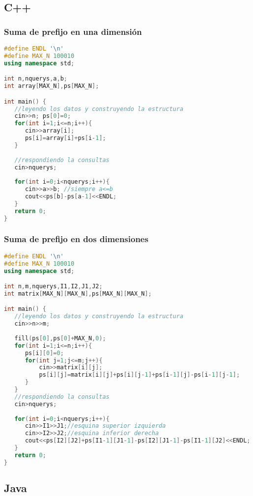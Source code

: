 \subsection{C++}
\subsubsection{Suma de prefijo en una dimensión}
\begin{lstlisting}[language=C++]
#define ENDL '\n'
#define MAX_N 100010
using namespace std;

int n,nquerys,a,b;
int array[MAX_N],ps[MAX_N];

int main() {
   //leyendo los datos y construyendo la estructura
   cin>>n; ps[0]=0;
   for(int i=1;i<=n;i++){
      cin>>array[i];
      ps[i]=array[i]+ps[i-1];
   }
	
   //respondiendo la consultas
   cin>nquerys;
	
   for(int i=0;i<nquerys;i++){
      cin>>a>>b; //siempre a<=b
      cout<<ps[b]-ps[a-1]<<ENDL;
   }
   return 0;
}
\end{lstlisting}
\subsubsection{Suma de prefijo en dos dimensiones}
\begin{lstlisting}[language=C++]
#define ENDL '\n'
#define MAX_N 100010
using namespace std;

int n,m,nquerys,I1,I2,J1,J2;
int matrix[MAX_N][MAX_N],ps[MAX_N][MAX_N];

int main() {
   //leyendo los datos y construyendo la estructura
   cin>>n>>m;
	
   fill(ps[0],ps[0]+MAX_N,0);
   for(int i=1;i<=n;i++){
      ps[i][0]=0;
      for(int j=1;j<=m;j++){
          cin>>matrix[i][j];
          ps[i][j]=matrix[i][j]+ps[i][j-1]+ps[i-1][j]-ps[i-1][j-1];
      }
   }
   //respondiendo la consultas
   cin>nquerys;
	
   for(int i=0;i<nquerys;i++){
      cin>>I1>>J1;//esquina superior izquierda
      cin>>I2>>J2;//esquina inferior derecha
      cout<<ps[I2][J2]+ps[I1-1][J1-1]-ps[I2][J1-1]-ps[I1-1][J2]<<ENDL;
   }
   return 0;
}
\end{lstlisting}
\subsection{Java}
